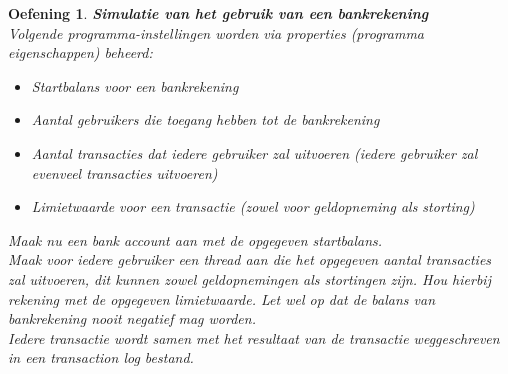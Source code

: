 \documentclass{tstextbook}
\newtheorem{envoefening}{Oefening}[chapter]
\newenvironment{oefening}
               {\begin{boxexercise}\begin{envoefening}}
               {\end{envoefening}\end{boxexercise}}
\begin{document}
\begin{oefening}
\textbf{Simulatie van het gebruik van een bankrekening}\\
Volgende programma-instellingen worden via properties (programma eigenschappen) beheerd:
\begin{itemize}
\item Startbalans voor een bankrekening
\item Aantal gebruikers die toegang hebben tot de bankrekening
\item Aantal transacties dat iedere gebruiker zal uitvoeren (iedere gebruiker zal evenveel transacties uitvoeren)
\item Limietwaarde voor een transactie (zowel voor geldopneming als storting)
\end{itemize}

Maak nu een bank account aan met de opgegeven startbalans.\\
Maak voor iedere gebruiker een thread aan die het opgegeven aantal transacties zal uitvoeren, dit kunnen zowel geldopnemingen als stortingen zijn. Hou hierbij rekening met de opgegeven limietwaarde. Let wel op dat de balans van bankrekening nooit negatief mag worden.\\
Iedere transactie wordt samen met het resultaat van de transactie weggeschreven in een transaction log bestand.
\end{oefening}
\end{document}
